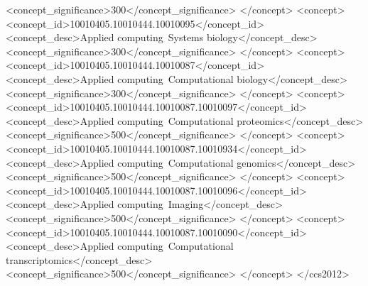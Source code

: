 \documentclass[sigconf,authordraft]{acmart}
\begin{document}
\begin{CCSXML}
       <concept_significance>300</concept_significance>
       </concept>
   <concept>
       <concept_id>10010405.10010444.10010095</concept_id>
       <concept_desc>Applied computing~Systems biology</concept_desc>
       <concept_significance>300</concept_significance>
       </concept>
   <concept>
       <concept_id>10010405.10010444.10010087</concept_id>
       <concept_desc>Applied computing~Computational biology</concept_desc>
       <concept_significance>300</concept_significance>
       </concept>
   <concept>
       <concept_id>10010405.10010444.10010087.10010097</concept_id>
       <concept_desc>Applied computing~Computational proteomics</concept_desc>
       <concept_significance>500</concept_significance>
       </concept>
   <concept>
       <concept_id>10010405.10010444.10010087.10010934</concept_id>
       <concept_desc>Applied computing~Computational genomics</concept_desc>
       <concept_significance>500</concept_significance>
       </concept>
   <concept>
       <concept_id>10010405.10010444.10010087.10010096</concept_id>
       <concept_desc>Applied computing~Imaging</concept_desc>
       <concept_significance>500</concept_significance>
       </concept>
   <concept>
       <concept_id>10010405.10010444.10010087.10010090</concept_id>
       <concept_desc>Applied computing~Computational transcriptomics</concept_desc>
       <concept_significance>500</concept_significance>
       </concept>
 </ccs2012>
\end{CCSXML}


\end{document}
